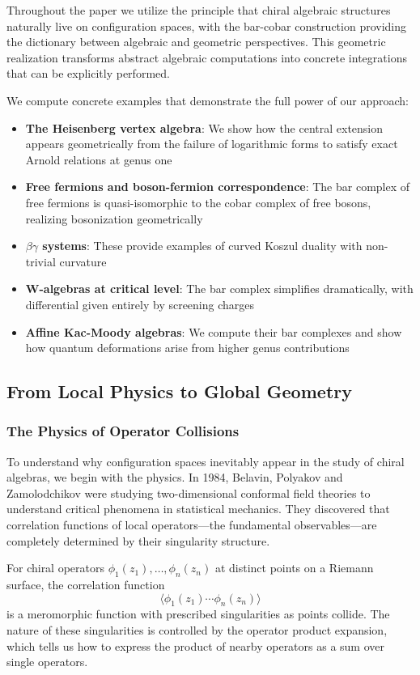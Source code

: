 Throughout the paper we utilize the principle that chiral algebraic structures naturally live on configuration spaces, with the bar-cobar construction providing the dictionary between algebraic and geometric perspectives. This geometric realization transforms abstract algebraic computations into concrete integrations that can be explicitly performed. 

We compute concrete examples that demonstrate the full power of our approach:
\begin{itemize}
\item \textbf{The Heisenberg vertex algebra}: We show how the central extension appears geometrically from the failure of logarithmic forms to satisfy exact Arnold relations at genus one
\item \textbf{Free fermions and boson-fermion correspondence}: The bar complex of free fermions is quasi-isomorphic to the cobar complex of free bosons, realizing bosonization geometrically
\item \textbf{$\beta\gamma$ systems}: These provide examples of curved Koszul duality with non-trivial curvature
\item \textbf{W-algebras at critical level}: The bar complex simplifies dramatically, with differential given entirely by screening charges
\item \textbf{Affine Kac-Moody algebras}: We compute their bar complexes and show how quantum deformations arise from higher genus contributions
\end{itemize}

\subsection{From Local Physics to Global Geometry}

\subsubsection{The Physics of Operator Collisions}

To understand why configuration spaces inevitably appear in the study of chiral algebras, we begin with the physics. In 1984, Belavin, Polyakov and Zamolodchikov \cite{BPZ84} were studying two-dimensional conformal field theories to understand critical phenomena in statistical mechanics. They discovered that correlation functions of local operators—the fundamental observables—are completely determined by their singularity structure.

For chiral operators $\phi_1(z_1), \ldots, \phi_n(z_n)$ at distinct points on a Riemann surface, the correlation function
$$\langle \phi_1(z_1) \cdots \phi_n(z_n) \rangle$$
is a meromorphic function with prescribed singularities as points collide. The nature of these singularities is controlled by the operator product expansion, which tells us how to express the product of nearby operators as a sum over single operators.

